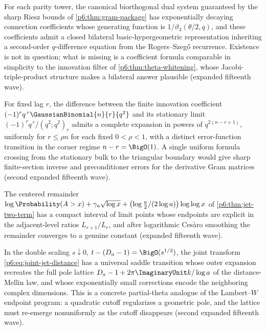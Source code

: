\documentclass[11pt,oneside]{article}
\numberwithin{equation}{section}
\theoremstyle{definition}
\theoremstyle{remark}
\begin{document}
\begin{conjecture}
\label{p6:conj:dual-tower}
For each parity tower, the canonical biorthogonal dual system guaranteed
by the sharp Riesz bounds of \cref{p6:thm:gram-package} has exponentially
decaying connection coefficients whose generating function is
$1/\vartheta_3(\theta/2,q)$, and these coefficients admit a closed
bilateral basic-hypergeometric representation inheriting a second-order
$q$-difference equation from the Rogers--Szeg\H{o} recurrence.  Existence
is not in question; what is missing is a coefficient formula comparable in
simplicity to the innovation filter of \cref{p6:thm:theta-whitening},
whose Jacobi-triple-product structure makes a bilateral answer plausible
(expanded fifteenth wave).
\end{conjecture}

\begin{conjecture}
\label{p6:conj:finite-section}
For fixed lag $r$, the difference between the finite innovation
coefficient $(-1)^rq^{\,r}\GaussianBinomial{n}{r}{q^2}$ and its stationary limit
$(-1)^rq^{\,r}/(q^2;q^2)_r$ admits a complete expansion in powers of
$q^{2(n-r+1)}$, uniformly for $r\le\rho n$ for each fixed $0<\rho<1$,
with a distinct error-function transition in the corner regime
$n-r=\BigO(1)$.  A single uniform formula crossing from the stationary
bulk to the triangular boundary would give sharp finite-section inverse
and preconditioner errors for the derivative Gram matrices (second
expanded fifteenth wave).
\end{conjecture}

\begin{conjecture}
\label{p6:conj:jet-staircase-limit}
The centered remainder
$\log\Probability(A>x)+\gamma_a\sqrt{\log x}
+\bigl(\log\tfrac a2/(2\log a)\bigr)\log\log x$ of
\cref{p6:thm:jet-two-term} has a compact interval of limit points whose
endpoints are explicit in the adjacent-level ratios $L_{r+1}/L_r$, and
after logarithmic Ces\`aro smoothing the remainder converges to a genuine
constant (expanded fifteenth wave).
\end{conjecture}

\begin{conjecture}
\label{p6:conj:ptheta-poles}
In the double scaling $s\downarrow0$,
$t-(D_a-1)=\BigO(s^{1/2})$, the joint transform
\eqref{p6:eq:joint-jet-distance} has a universal saddle transition whose
outer expansion recreates the full pole lattice $D_a-1+2\pi\ImaginaryUnit k/\log a$
of the distance-Mellin law, and whose exponentially small corrections
encode the neighboring complex dimensions.  This is a concrete
partial-theta analogue of the Lambert--$W$ endpoint program: a quadratic
cutoff regularizes a geometric pole, and the lattice must re-emerge
nonuniformly as the cutoff disappears (second expanded fifteenth wave).
\end{conjecture}
\end{document}
